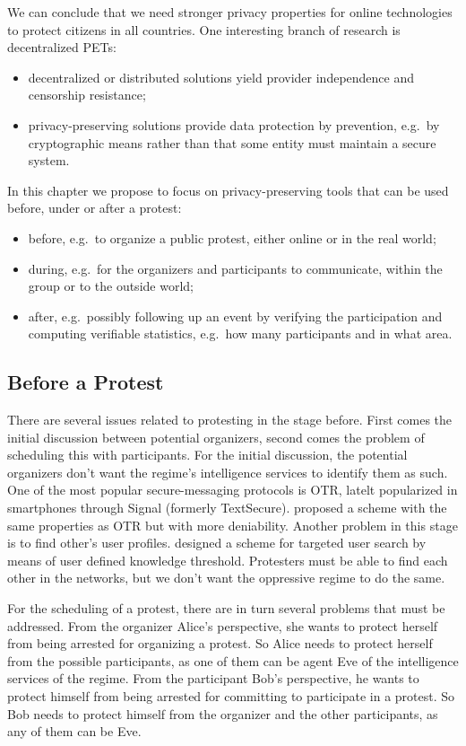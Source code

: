 \documentclass[a4paper]{llncs}
\begin{document}
We can conclude that we need stronger privacy properties for online 
technologies to protect citizens in all countries.
One interesting branch of research is decentralized \acp{PET}:
\begin{itemize}
  \item decentralized or distributed solutions yield provider independence and 
    censorship resistance;
  \item privacy-preserving solutions provide data protection by prevention, 
    e.g.\ by cryptographic means rather than that some entity must maintain 
    a secure system.
\end{itemize}
In this chapter we propose to focus on privacy-preserving tools that can be 
used before, under or after a protest:
\begin{itemize}
  \item before, e.g.\ to organize a public protest, either online or in the 
    real world;
  \item during, e.g.\ for the organizers and participants to communicate, 
    within the group or to the outside world;
  \item after, e.g.\ possibly following up an event by verifying the 
    participation and computing verifiable statistics, e.g.\ how many 
    participants and in what area.
\end{itemize}


\subsection{Before a Protest}
\label{BeforeProtest}

There are several issues related to protesting in the stage before.
First comes the initial discussion between potential organizers, second comes 
the problem of scheduling this with participants.
For the initial discussion, the potential organizers don't want the regime's 
intelligence services to identify them as such.
One of the most popular secure-messaging protocols is \ac{OTR}, latelt 
popularized in smartphones through Signal (formerly TextSecure).
\citet{OTPKX} proposed a scheme with the same properties as \ac{OTR} but with 
more deniability.
Another problem in this stage is to find other's user profiles.
\citet{ThresholdUserSearch} designed a scheme for targeted user search by means 
of user defined knowledge threshold.
Protesters must be able to find each other in the networks, but we don't want 
the oppressive regime to do the same.

For the scheduling of a protest, there are in turn several problems that must 
be addressed.
From the organizer Alice's perspective, she wants to protect herself from being 
arrested for organizing a protest.
So Alice needs to protect herself from the possible participants, as one of 
them can be agent Eve of the intelligence services of the regime.
From the participant Bob's perspective, he wants to protect himself from being 
arrested for committing to participate in a protest.
So Bob needs to protect himself from the organizer and the other participants, 
as any of them can be Eve.
\end{document}
